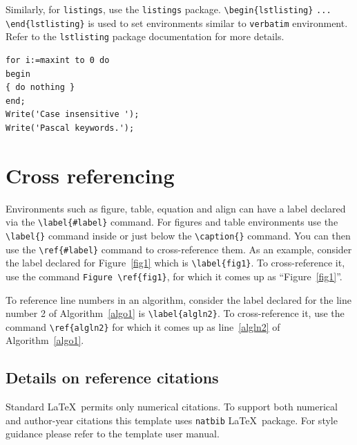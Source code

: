 \documentclass[sn-mathphys]{sn-jnl}%
\theoremstyle{thmstyleone}%
\theoremstyle{thmstyletwo}%
\theoremstyle{thmstylethree}%
\begin{document}
Similarly, for \verb+listings+, use the \verb+listings+ package. \verb+\begin{lstlisting}+ \verb+...+ \verb+\end{lstlisting}+ is used to set environments similar to \verb+verbatim+ environment. Refer to the \verb+lstlisting+ package documentation for more details.

\bigskip
\begin{minipage}{\hsize}%
\lstset{frame=single,framexleftmargin=-1pt,framexrightmargin=-17pt,framesep=12pt,linewidth=0.98\textwidth,language=pascal}%
\begin{lstlisting}
for i:=maxint to 0 do
begin
{ do nothing }
end;
Write('Case insensitive ');
Write('Pascal keywords.');
\end{lstlisting}
\end{minipage}

\section{Cross referencing}\label{sec8}

Environments such as figure, table, equation and align can have a label
declared via the \verb+\label{#label}+ command. For figures and table
environments use the \verb+\label{}+ command inside or just
below the \verb+\caption{}+ command. You can then use the
\verb+\ref{#label}+ command to cross-reference them. As an example, consider
the label declared for Figure~\ref{fig1} which is
\verb+\label{fig1}+. To cross-reference it, use the command 
\verb+Figure \ref{fig1}+, for which it comes up as
``Figure~\ref{fig1}''. 

To reference line numbers in an algorithm, consider the label declared for the line number 2 of Algorithm~\ref{algo1} is \verb+\label{algln2}+. To cross-reference it, use the command \verb+\ref{algln2}+ for which it comes up as line~\ref{algln2} of Algorithm~\ref{algo1}.

\subsection{Details on reference citations}\label{subsec7}

Standard \LaTeX\ permits only numerical citations. To support both numerical and author-year citations this template uses \verb+natbib+ \LaTeX\ package. For style guidance please refer to the template user manual.
\end{document}
